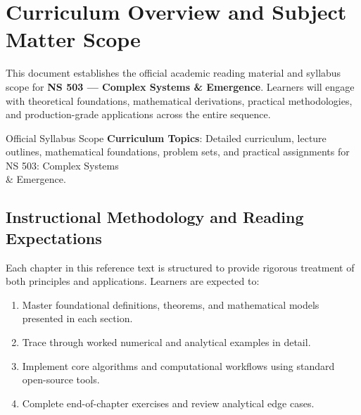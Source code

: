 \section{Curriculum Overview and Subject Matter Scope}

This document establishes the official academic reading material and syllabus scope for \textbf{NS 503 --- Complex Systems \& Emergence}. Learners will engage with theoretical foundations, mathematical derivations, practical methodologies, and production-grade applications across the entire sequence.

\begin{InsightBox}{Official Syllabus Scope}
  \textbf{Curriculum Topics}: Detailed curriculum, lecture outlines, mathematical foundations, problem sets, and practical assignments for NS 503: Complex Systems \\& Emergence.
\end{InsightBox}

\subsection{Instructional Methodology and Reading Expectations}

Each chapter in this reference text is structured to provide rigorous treatment of both principles and applications. Learners are expected to:
\begin{enumerate}
  \item Master foundational definitions, theorems, and mathematical models presented in each section.
  \item Trace through worked numerical and analytical examples in detail.
  \item Implement core algorithms and computational workflows using standard open-source tools.
  \item Complete end-of-chapter exercises and review analytical edge cases.
\end{enumerate}

